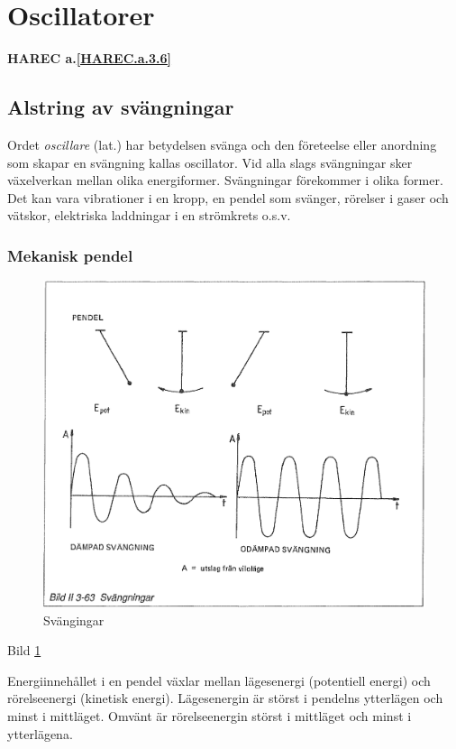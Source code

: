 \section{Oscillatorer}
\textbf{HAREC a.\ref{HAREC.a.3.6}\label{myHAREC.a.3.6}}

\subsection{Alstring av svängningar}
Ordet \emph{oscillare} (lat.) har betydelsen svänga och den företeelse
eller anordning som skapar en svängning kallas oscillator. Vid alla
slags svängningar sker växelverkan mellan olika
energiformer. Svängningar förekommer i olika former. Det kan vara
vibrationer i en kropp, en pendel som svänger, rörelser i gaser och
vätskor, elektriska laddningar i en strömkrets o.s.v.

\subsubsection{Mekanisk pendel}

\begin{figure}
\includegraphics[width=\textwidth]{images/bild_2_3-63}
\caption{Svängingar}
\label{fig:BildII3-63}
\end{figure}

Bild \ref{fig:BildII3-63}

Energiinnehållet i en pendel växlar mellan lägesenergi (potentiell
energi) och rörelseenergi (kinetisk energi). Lägesenergin är störst i
pendelns ytterlägen och minst i mittläget. Omvänt är rörelseenergin
störst i mittläget och minst i ytterlägena.

